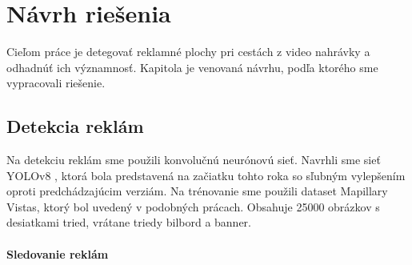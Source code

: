 \chapter{Návrh riešenia}\label{chap:proposal}

Cieľom práce je detegovať reklamné plochy pri cestách z video nahrávky a odhadnúť ich významnosť. Kapitola je venovaná návrhu, podľa ktorého sme vypracovali riešenie.  



\section{Detekcia reklám}

Na detekciu reklám sme použili konvolučnú neurónovú sieť. Navrhli sme sieť YOLOv8 \cite{yolov8}, ktorá bola predstavená na začiatku tohto roka so sľubným vylepšením oproti predchádzajúcim verziám. Na trénovanie sme použili dataset Mapillary Vistas, ktorý bol uvedený v podobných prácach. Obsahuje 25000 obrázkov s desiatkami tried, vrátane triedy bilbord a banner. %



\subsubsection{Sledovanie reklám}


